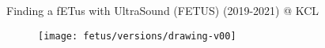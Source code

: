 {
\begin{frame}{Finding a fETus with UltraSound (FETUS) (2019-2021) @ KCL}
      \begin{figure}
        \centering
        \texttt{[image: fetus/versions/drawing-v00]}
      \end{figure}
\end{frame}
}










